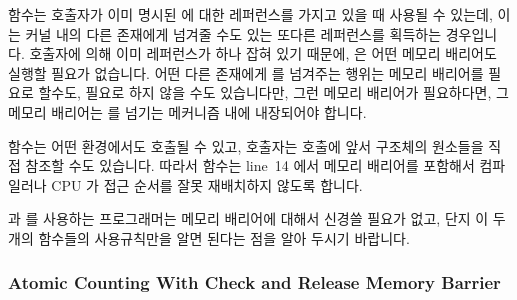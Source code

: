  함수는 호출자가 이미 명시된  에 대한 레퍼런스를
가지고 있을 때 사용될 수 있는데, 이는 커널 내의 다른 존재에게 넘겨줄 수도 있는
또다른 레퍼런스를 획득하는 경우입니다.
호출자에 의해 이미 레퍼런스가 하나 잡혀 있기 때문에,  은 어떤
메모리 배리어도 실행할 필요가 없습니다.
어떤 다른 존재에게  를 넘겨주는 행위는 메모리 배리어를 필요로
할수도, 필요로 하지 않을 수도 있습니다만, 그런 메모리 배리어가 필요하다면, 그
메모리 배리어는  를 넘기는 메커니즘 내에 내장되어야 합니다.
\iffalse

The \co{dst_clone()} primitive may be used if the caller
already has a reference to the specified \co{dst_entry},
in which case it obtains another reference that may be handed off
to some other entity within the kernel.
Because a reference is already held by the caller, \co{dst_clone()}
need not execute any memory barriers.
The act of handing the \co{dst_entry} to some other entity might
or might not require a memory barrier, but if such a memory barrier
is required, it will be embedded in the mechanism used to hand the
\co{dst_entry} off.
\fi

 함수는 어떤 환경에서도 호출될 수 있고, 호출자는
 호출에 앞서  구조체의 원소들을 직접 참조할
수도 있습니다.
따라서  함수는 line~14 에서 메모리 배리어를 포함해서
컴파일러나 CPU 가 접근 순서를 잘못 재배치하지 않도록 합니다.

 과  를 사용하는 프로그래머는 메모리 배리어에
대해서 신경쓸 필요가 없고, 단지 이 두개의 함수들의 사용규칙만을 알면 된다는
점을 알아 두시기 바랍니다.
\iffalse

The \co{dst_release()} primitive may be invoked from any environment,
and the caller might well reference elements of the \co{dst_entry}
structure immediately prior to the call to \co{dst_release()}.
The \co{dst_release()} primitive therefore contains a memory
barrier on line~14 preventing both the compiler and the CPU
from misordering accesses.

Please note that the programmer making use of \co{dst_clone()} and
\co{dst_release()} need not be aware of the memory barriers, only
of the rules for using these two primitives.
\fi

\subsubsection{Atomic Counting With Check and Release Memory Barrier}
\label{sec:together:Atomic Counting With Check and Release Memory Barrier}

